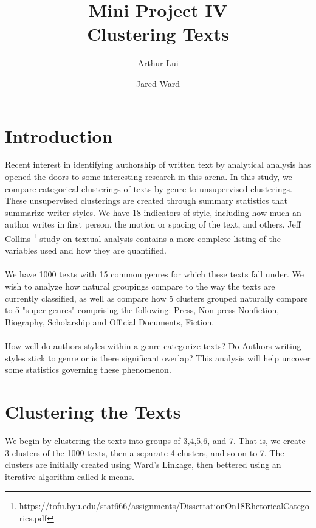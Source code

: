 \documentclass[11pt]{article}
\begin{document}
\onehalfspacing

\title{Mini Project IV \\
Clustering Texts} 
\author{Arthur Lui \and Jared Ward}

\maketitle

\section*{Introduction}
Recent interest in identifying authorship of written text by analytical analysis
has opened the doors to some interesting research in this arena. In this study,
we compare categorical clusterings of texts by genre to unsupervised
clusterings. These unsupervised clusterings are created through summary
statistics that summarize writer styles. We have 18 indicators of style,
including how much an author writes in first person, the motion or spacing of
the text, and others.  Jeff Collins
\footnote{https://tofu.byu.edu/stat666/assignments/DissertationOn18RhetoricalCategories.pdf}
study on textual analysis contains a more complete listing of the variables used
and how they are quantified. 
\\
\\
We have 1000 texts with 15 common genres for which these texts fall under. We
wish to analyze how natural groupings compare to the way the texts are currently
classified, as well as compare how 5 clusters grouped naturally compare to 5
"super genres" comprising the following: Press, Non-press Nonfiction, Biography,
Scholarship and Official Documents, Fiction. 
\\
\\
How well do authors styles within a genre categorize texts? Do Authors writing
styles stick to genre or is there significant overlap? This analysis will help
uncover some statistics governing these phenomenon.  

\section*{Clustering the Texts}
We begin by clustering the texts into groups of 3,4,5,6, and 7. That is, we
create 3 clusters of the 1000 texts, then a separate 4 clusters, and so on to 7.
The clusters are initially created using Ward's Linkage, then bettered using an
iterative algorithm called k-means.
\end{document}
